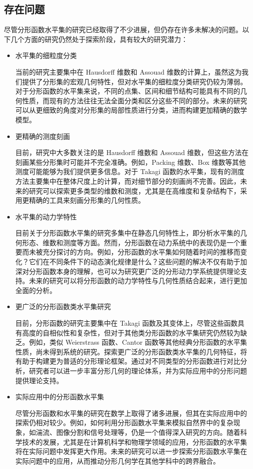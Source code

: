 \subsection{存在问题}

尽管分形函数水平集的研究已经取得了不少进展，但仍存在许多未解决的问题。以下几个方面的研究仍然处于探索阶段，具有较大的研究潜力：
\begin{itemize}

\item 水平集的细粒度分类

当前的研究主要集中在 Hausdorff 维数和 Assouad 维数的计算上，虽然这为我们提供了分形集的宏观几何特性，但对水平集的细粒度分类研究仍较为薄弱。对于分形函数的水平集来说，不同的点集、区间和细节结构可能具有不同的几何性质，而现有的方法往往无法全面分类和区分这些不同的部分。未来的研究可以从更细致的角度对分形集的局部性质进行分类，进而构建更加精确的数学模型。
\item 更精确的测度刻画

目前，研究中大多数关注的是 Hausdorff 维数和 Assouad 维数，但这些方法在刻画某些分形集时可能并不完全准确。例如，Packing 维数、Box 维数等其他测度可能能够为我们提供更多信息。对于 Takagi 函数的水平集，现有的测度方法主要集中在整体尺度上的计算，而对细节部分的刻画尚不完善。因此，未来的研究可以探索更多类型的维数和测度，尤其是在高维度和复杂结构下，采用更精确的工具来刻画分形集的几何性质。
\item 水平集的动力学特性

目前关于分形函数水平集的研究多集中在静态几何特性上，即分析水平集的几何形态、维数和测度等方面。然而，分形函数在动力系统中的表现仍是一个重要而未被充分探讨的方向。例如，分形函数的水平集如何随着时间的推移而变化？它们在不同条件下的动态演化规律是什么？这些问题的解决不仅有助于加深对分形函数本身的理解，也可以为研究更广泛的分形动力学系统提供理论支持。未来的研究可以将分形函数的动力学特性与几何性质结合起来，进行更加全面的分析。
\item 更广泛的分形函数类水平集研究

目前，分形函数的研究主要集中在 Takagi 函数及其变体上，尽管这些函数具有高度的自相似性和复杂性，但对于其他类分形函数的水平集研究仍然较为缺乏。例如，类似 Weierstrass 函数、Cantor 函数等其他经典分形函数的水平集性质，尚未得到系统的研究。探索更广泛的分形函数类水平集的几何特征，将有助于构建更为普适的分形理论框架。通过对不同类型的分形函数进行对比分析，研究者可以进一步丰富分形几何的理论体系，并为实际应用中的分形问题提供理论支持。
\item 实际应用中的分形函数水平集

尽管分形函数和水平集的研究在数学上取得了诸多进展，但其在实际应用中的探索仍相对较少。例如，如何利用分形函数水平集来模拟自然界中的复杂现象，如湍流、图像分割和信号处理等，仍是一个值得深入研究的方向。随着科学技术的发展，尤其是在计算机科学和物理学领域的应用，分形函数的水平集将在实际问题中发挥更大作用。未来的研究可以进一步探索分形函数水平集在实际问题中的应用，从而推动分形几何学在其他学科中的跨界融合。

\end{itemize}

